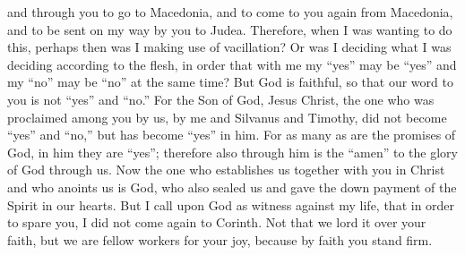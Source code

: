 \begin{biblechapter}
\verse and through you to go to Macedonia, and to come to you again from Macedonia, and to be sent on my way by you to Judea.
\verse Therefore, when I was wanting to do this, perhaps then was I making use of vacillation? Or was I deciding what I was deciding according to the flesh, in order that with me my “yes” may be “yes” and my “no” may be “no” at the same time?
\verse But God is faithful, so that our word to you is not “yes” and “no.”
\verse For the Son of God, Jesus Christ, the one who was proclaimed among you by us, by me and Silvanus and Timothy, did not become “yes” and “no,” but has become “yes” in him.
\verse For as many as are the promises of God, in him they are “yes”; therefore also through him is the “amen” to the glory of God through us.
\verse Now the one who establishes us together with you in Christ and who anoints us is God,
\verse who also sealed us and gave the down payment of the Spirit in our hearts.
\verse But I call upon God as witness against my life, that in order to spare you, I did not come again to Corinth.
\verse Not that we lord it over your faith, but we are fellow workers for your joy, because by faith you stand firm.
\end{biblechapter}

